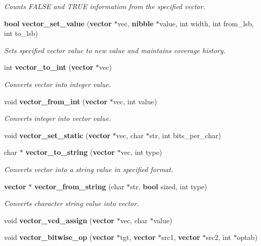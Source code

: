 \begin{CompactItemize}
\begin{CompactList}\small\item\em Counts FALSE and TRUE information from the specified vector.\item\end{CompactList}\item 
{\bf bool} {\bf vector\_\-set\_\-value} ({\bf vector} $\ast$vec, {\bf nibble} $\ast$value, int width, int from\_\-lsb, int to\_\-lsb)
\begin{CompactList}\small\item\em Sets specified vector value to new value and maintains coverage history.\item\end{CompactList}\item 
int {\bf vector\_\-to\_\-int} ({\bf vector} $\ast$vec)
\begin{CompactList}\small\item\em Converts vector into integer value.\item\end{CompactList}\item 
void {\bf vector\_\-from\_\-int} ({\bf vector} $\ast$vec, int value)
\begin{CompactList}\small\item\em Converts integer into vector value.\item\end{CompactList}\item 
void {\bf vector\_\-set\_\-static} ({\bf vector} $\ast$vec, char $\ast$str, int bits\_\-per\_\-char)
\item 
char $\ast$ {\bf vector\_\-to\_\-string} ({\bf vector} $\ast$vec, int type)
\begin{CompactList}\small\item\em Converts vector into a string value in specified format.\item\end{CompactList}\item 
{\bf vector} $\ast$ {\bf vector\_\-from\_\-string} (char $\ast$str, {\bf bool} sized, int type)
\begin{CompactList}\small\item\em Converts character string value into vector.\item\end{CompactList}\item 
void {\bf vector\_\-vcd\_\-assign} ({\bf vector} $\ast$vec, char $\ast$value)
\item 
void {\bf vector\_\-bitwise\_\-op} ({\bf vector} $\ast$tgt, {\bf vector} $\ast$src1, {\bf vector} $\ast$src2, int $\ast$optab)

\end{CompactItemize}
